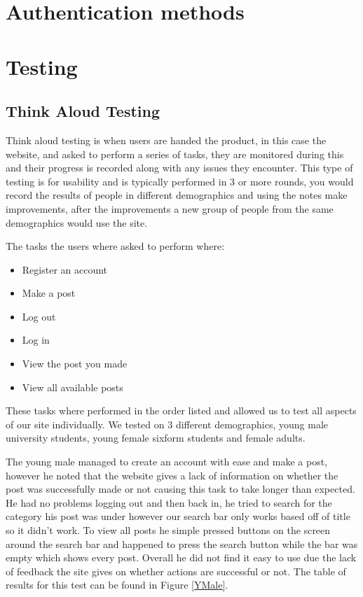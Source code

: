 \documentclass{cmpstyle}
\begin{document}
 
\section{Authentication methods}	
	
\section{Testing}
\subsection{Think Aloud Testing}
Think aloud testing is when users are handed the product, in this case the website, and asked to perform a series of tasks, they are monitored during this and their progress is recorded along with any issues they encounter. This type of testing is for usability and is typically performed in 3 or more rounds, you would record the results of people in different demographics and using the notes make improvements, after the improvements a new group of people from the same demographics would use the site.

The tasks the users where asked to perform where:
\begin{itemize}
	\item Register an account
	\item Make a post
	\item Log out
	\item Log in
	\item View the post you made
	\item View all available posts
\end{itemize}
These tasks where performed in the order listed and allowed us to test all aspects of our site individually. We tested on 3 different demographics, young male university students, young female sixform students and female adults. 

The young male managed to create an account with ease and make a post, however he noted that the website gives a lack of information on whether the post was successfully made or not causing this task to take longer than expected. He had no problems logging out and then back in, he tried to search for the category his post was under however our search bar only works based off of title so it didn't work. To view all posts he simple pressed buttons on the screen around the search bar and happened to press the search button while the bar was empty which shows every post. Overall he did not find it easy to use due the lack of feedback the site gives on whether actions are successful or not. The table of results for this test can be found in Figure \ref{YMale}.
\end{document}
